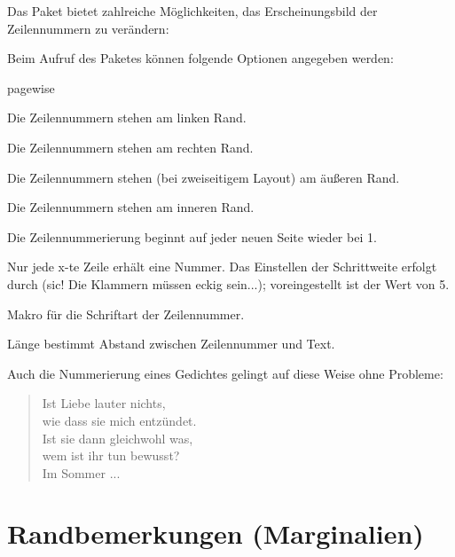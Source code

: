 
Das Paket bietet zahlreiche Möglichkeiten, das Erscheinungsbild der Zeilennummern zu 
verändern:

Beim Aufruf des Paketes können folgende Optionen angegeben werden:

\begin{labeling}{pagewise}
 \item[left] Die Zeilennummern stehen am linken Rand.
 \item[right] Die Zeilennummern stehen am rechten Rand.
 \item[switch] Die Zeilennummern stehen (bei zweiseitigem Layout) am äußeren Rand.
 \item[switch*] Die Zeilennummern stehen am inneren Rand.
 \item[pagewise] Die Zeilennummerierung beginnt auf jeder neuen Seite wieder bei 1.
 \item[modulo] Nur jede x-te Zeile erhält eine Nummer. 
  Das Einstellen der Schrittweite erfolgt durch  
  (sic! Die Klammern müssen eckig sein...);
  voreingestellt ist der Wert von 5.
\end{labeling}

Makro  für die Schriftart der Zeilennummer.

Länge  bestimmt Abstand zwischen Zeilennummer und Text.

 


Auch die Nummerierung eines Gedichtes gelingt auf diese Weise ohne Probleme:

\begin{LTXexample}
 \begin{verse}
  \modulolinenumbers[5]
  \linenumbers
  Ist Liebe lauter nichts,\\
  wie dass sie mich entzündet.\\
  Ist sie dann gleichwohl was,\\
  wem ist ihr tun bewusst?\\
  
  Im Sommer ...\\
 \end{verse}

\end{LTXexample}



\section{Randbemerkungen (Marginalien)}

